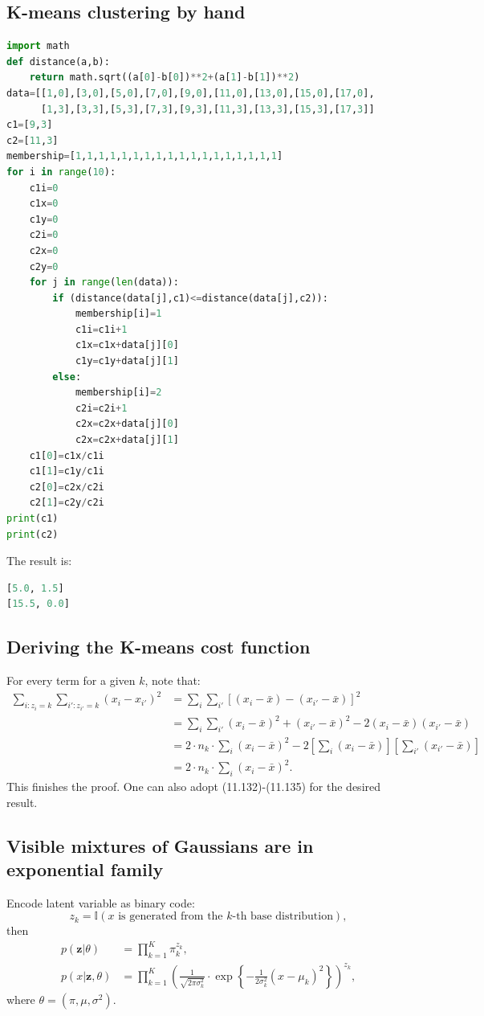 \documentclass[UTF8]{ctexart}
\begin{document}
\subsection{K-means clustering by hand}
\begin{lstlisting}[language=python]
import math
def distance(a,b):
    return math.sqrt((a[0]-b[0])**2+(a[1]-b[1])**2)
data=[[1,0],[3,0],[5,0],[7,0],[9,0],[11,0],[13,0],[15,0],[17,0],
      [1,3],[3,3],[5,3],[7,3],[9,3],[11,3],[13,3],[15,3],[17,3]]
c1=[9,3]
c2=[11,3]
membership=[1,1,1,1,1,1,1,1,1,1,1,1,1,1,1,1,1,1]
for i in range(10):
    c1i=0
    c1x=0
    c1y=0
    c2i=0
    c2x=0
    c2y=0
    for j in range(len(data)):
        if (distance(data[j],c1)<=distance(data[j],c2)):
            membership[i]=1
            c1i=c1i+1
            c1x=c1x+data[j][0]
            c1y=c1y+data[j][1]
        else:
            membership[i]=2
            c2i=c2i+1
            c2x=c2x+data[j][0]
            c2x=c2x+data[j][1]
    c1[0]=c1x/c1i
    c1[1]=c1y/c1i
    c2[0]=c2x/c2i
    c2[1]=c2y/c2i
print(c1)
print(c2)
\end{lstlisting}
The result is:
\begin{lstlisting}[language=python]
[5.0, 1.5]
[15.5, 0.0]
\end{lstlisting}

\subsection{Deriving the K-means cost function}
For every term for a given $k$, note that:
$$
\begin{aligned}
\sum_{i:z_{i}=k}\sum_{i':z_{i'}=k}(x_{i}-x_{i'})^{2}&=\sum_{i}\sum_{i'}\left[(x_{i}-\bar{x})-(x_{i'}-\bar{x}) \right]^{2}\\
&=\sum_{i}\sum_{i'}(x_{i}-\bar{x})^{2}+(x_{i'}-\bar{x})^{2}-2(x_{i}-\bar{x})(x_{i'}-\bar{x})\\
&=2\cdot n_{k}\cdot\sum_{i}(x_{i}-\bar{x})^{2}-2\left[\sum_{i}(x_{i}-\bar{x}) \right]\left[\sum_{i'}(x_{i'}-\bar{x}) \right]\\
&=2\cdot n_{k} \cdot\sum_{i}(x_{i}-\bar{x})^{2}.
\end{aligned}
$$
This finishes the proof.
One can also adopt (11.132)-(11.135) for the desired result.


\subsection{Visible mixtures of Gaussians are in exponential family}
Encode latent variable as binary code:
$$z_{k}=\mathbb{I}(x\text{ is generated from the }k\text{-th base distribution}),$$
then
$$
\begin{aligned}
p(\textbf{z}|\theta)&=\prod_{k=1}^{K}\pi_{k}^{z_{k}},\\
p(x|\textbf{z},\theta)&=\prod_{k=1}^{K}\left(\frac{1}{\sqrt{2\pi \sigma_{k}^{2}}}\cdot\exp\left\{ -\frac{1}{2\sigma_{k}^{2}}(x-\mu_{k})^{2} \right\}\right)^{z_{k}},
\end{aligned}
$$
where $\theta=(\pi,\mu,\sigma^{2})$.
\end{document}
